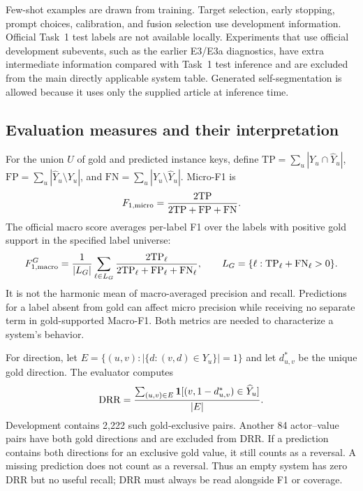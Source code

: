 \documentclass[12pt,a4paper]{article}
\begin{document}
Few-shot examples are drawn from training. Target selection, early stopping, prompt choices, calibration, and fusion selection use development information. Official Task~1 test labels are not available locally. Experiments that use official development subevents, such as the earlier E3/E3a diagnostics, have extra intermediate information compared with Task~1 test inference and are excluded from the main directly applicable system table. Generated self-segmentation is allowed because it uses only the supplied article at inference time.

\subsection{Evaluation measures and their interpretation}
For the union $U$ of gold and predicted instance keys, define $\mathrm{TP}=\sum_u|Y_u\cap\widehat{Y}_u|$, $\mathrm{FP}=\sum_u|\widehat{Y}_u\setminus Y_u|$, and $\mathrm{FN}=\sum_u|Y_u\setminus\widehat{Y}_u|$. Micro-F1 is
\begin{equation}
\micro=\frac{2\mathrm{TP}}{2\mathrm{TP}+\mathrm{FP}+\mathrm{FN}}.
\label{eq:micro}
\end{equation}
The official macro score averages per-label F1 over the labels with positive gold support in the specified label universe:
\begin{equation}
\macro=\frac{1}{|L_G|}\sum_{\ell\in L_G}
\frac{2\mathrm{TP}_\ell}{2\mathrm{TP}_\ell+\mathrm{FP}_\ell+\mathrm{FN}_\ell},
\qquad L_G=\{\ell:\mathrm{TP}_\ell+\mathrm{FN}_\ell>0\}.
\label{eq:macro}
\end{equation}
It is not the harmonic mean of macro-averaged precision and recall. Predictions for a label absent from gold can affect micro precision while receiving no separate term in gold-supported Macro-F1. Both metrics are needed to characterize a system's behavior.

For direction, let $E=\{(u,v):|\{d:(v,d)\in Y_u\}|=1\}$ and let $d^*_{u,v}$ be the unique gold direction. The evaluator computes
\begin{equation}
\drr=\frac{\sum_{(u,v)\in E}\mathbf{1}[(v,1-d^*_{u,v})\in\widehat{Y}_u]}{|E|}.
\label{eq:drr}
\end{equation}
Development contains 2,222 such gold-exclusive pairs. Another 84 actor--value pairs have both gold directions and are excluded from DRR. If a prediction contains both directions for an exclusive gold value, it still counts as a reversal. A missing prediction does not count as a reversal. Thus an empty system has zero DRR but no useful recall; DRR must always be read alongside F1 or coverage.
\end{document}
